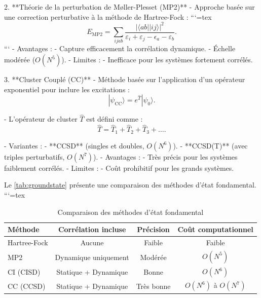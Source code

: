 \documentclass[12pt,a4paper]{report}
\begin{document}
\begin{markdown}
2. **Théorie de la perturbation de Møller-Plesset (MP2)**
   - Approche basée sur une correction perturbative à la méthode de Hartree-Fock :
```{=tex}
\[
E_{\text{MP2}} = \sum_{ijab} \frac{|\langle ab || ij \rangle|^2}{\varepsilon_i + \varepsilon_j - \epsilon_a - \varepsilon_b} .
\]
```
   - Avantages :
     - Capture efficacement la corrélation dynamique.
     - Échelle modérée (\(O(N^5)\)).
   - Limites :
     - Inefficace pour les systèmes fortement corrélés.

3. **Cluster Couplé (CC)**
   - Méthode basée sur l'application d'un opérateur exponentiel pour inclure les excitations :
\[
|\psi_{\text{CC}}\rangle = e^{\hat{T}} |\psi_0\rangle .
\]

   - L'opérateur de cluster \(\hat{T}\) est défini comme :
\[
\hat{T} = \hat{T}_1 + \hat{T}_2 + \hat{T}_3 + \dots .
\]

   - Variantes :
     - **CCSD** (singles et doubles, \(O(N^6)\)).
     - **CCSD(T)** (avec triples perturbatifs, \(O(N^7)\)).
   - Avantages :
     - Très précis pour les systèmes faiblement corrélés.
   - Limites :
     - Coût prohibitif pour les grands systèmes.

Le \autoref{tab:groundstate} présente une comparaison des méthodes d'état fondamental.
```{=tex}
\begin{table}[h!]
\centering
\caption{Comparaison des méthodes d'état fondamental}
\begin{tabular}{@{}lccc@{}}
\toprule
\textbf{Méthode}       & \textbf{Corrélation incluse} & \textbf{Précision}  & \textbf{Coût computationnel} \\ \midrule
Hartree-Fock           & Aucune                      & Faible              & Faible                       \\
MP2                    & Dynamique uniquement        & Modérée             & $O(N^5)$                     \\
CI (CISD)              & Statique + Dynamique        & Bonne               & $O(N^6)$                     \\
CC (CCSD)              & Statique + Dynamique        & Très bonne          & $O(N^6)$ à $O(N^7)$          \\ \bottomrule
\end{tabular}
\label{tab:groundstate}
\end{table}


\begin{tikzpicture}[
    mybox/.style={draw=black, thick, fill=blue!10, rounded corners, inner sep=10pt},
    title/.style={font=\bfseries}
]


\end{tikzpicture}
\end{markdown}
\end{document}
